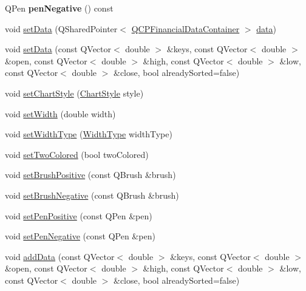 \begin{DoxyCompactItemize}
\item 
Q\+Pen {\bfseries pen\+Negative} () const \hypertarget{classQCPFinancial_a557fe911aa04f70c1734c8fa09994148}{}\label{classQCPFinancial_a557fe911aa04f70c1734c8fa09994148}

\item 
void \hyperlink{classQCPFinancial_a72089e75b8a50d18097526c3c79fdb85}{set\+Data} (Q\+Shared\+Pointer$<$ \hyperlink{classQCPDataContainer}{Q\+C\+P\+Financial\+Data\+Container} $>$ \hyperlink{classQCPFinancial_ad37e283817eff038a05ccba7ae22a630}{data})
\item 
void \hyperlink{classQCPFinancial_a12992e669ed19d7bb48dbe601570cc05}{set\+Data} (const Q\+Vector$<$ double $>$ \&keys, const Q\+Vector$<$ double $>$ \&open, const Q\+Vector$<$ double $>$ \&high, const Q\+Vector$<$ double $>$ \&low, const Q\+Vector$<$ double $>$ \&close, bool already\+Sorted=false)
\item 
void \hyperlink{classQCPFinancial_a5a59175d36279d71596e64d7bb65596f}{set\+Chart\+Style} (\hyperlink{classQCPFinancial_a0f800e21ee98d646dfc6f8f89d10ebfb}{Chart\+Style} style)
\item 
void \hyperlink{classQCPFinancial_a99633f8bac86a61d534ae5eeb1a3068f}{set\+Width} (double width)
\item 
void \hyperlink{classQCPFinancial_a204b7b710352796593a432b723e34089}{set\+Width\+Type} (\hyperlink{classQCPFinancial_aef1761dda71a53dc5269685e9e492626}{Width\+Type} width\+Type)
\item 
void \hyperlink{classQCPFinancial_a138e44aac160a17a9676652e240c5f08}{set\+Two\+Colored} (bool two\+Colored)
\item 
void \hyperlink{classQCPFinancial_a5ebff2b1764efd07cc44942e67821829}{set\+Brush\+Positive} (const Q\+Brush \&brush)
\item 
void \hyperlink{classQCPFinancial_a8bbdd87629f9144b3ef51af660c0961a}{set\+Brush\+Negative} (const Q\+Brush \&brush)
\item 
void \hyperlink{classQCPFinancial_ac58aa3adc7a35aab0088764b840683e5}{set\+Pen\+Positive} (const Q\+Pen \&pen)
\item 
void \hyperlink{classQCPFinancial_afe5c07e94ccea01a75b3a2476993c346}{set\+Pen\+Negative} (const Q\+Pen \&pen)
\item 
void \hyperlink{classQCPFinancial_a372ac031e44a7a6c912d203556af96f7}{add\+Data} (const Q\+Vector$<$ double $>$ \&keys, const Q\+Vector$<$ double $>$ \&open, const Q\+Vector$<$ double $>$ \&high, const Q\+Vector$<$ double $>$ \&low, const Q\+Vector$<$ double $>$ \&close, bool already\+Sorted=false)

\end{DoxyCompactItemize}
